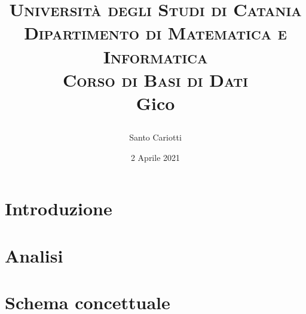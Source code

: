 

\title{
    \small\textsc{Università degli Studi di Catania\\Dipartimento di Matematica e Informatica\\Corso di Basi di Dati}\\
    \Huge\textbf{Gico}\\
    \author{Santo Cariotti}
    \date{2 Aprile 2021}
}

\usepackage{graphicx}

\maketitle

\renewcommand{\contentsname}{Indice}
\tableofcontents{}


\chapter{Introduzione}


\chapter{Analisi}


\chapter{Schema concettuale}




